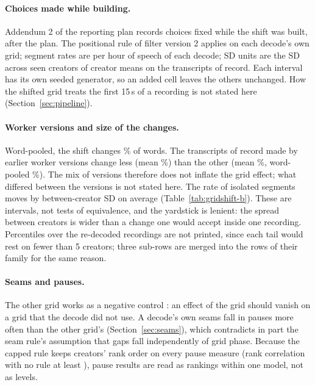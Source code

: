 \paragraph{Choices made while building.} Addendum 2 of the reporting plan records choices fixed while the shift was
built, after the plan. The positional rule of filter version 2 applies on each decode's own grid; segment rates are per
hour of speech of each decode; SD units are the SD across seen creators of creator means on the transcripts of record. Each interval has its own seeded generator, so an added cell leaves the others unchanged. How the shifted grid
treats the first 15\,s of a recording is not stated here (Section~\ref{sec:pipeline}).

\paragraph{Worker versions and size of the changes.} Word-pooled, the shift changes \GsChangedPooledPct\% of words. The
\GsEarlierVersionRecordings{} transcripts of record made by earlier worker versions change less (mean
\GsEarlierVersionMeanPct\%) than the other \GsSameVersionRecordings{} (mean \GsSameVersionMeanPct\%, word-pooled
\GsSameVersionPct\%). The mix of versions therefore does not inflate the grid effect; what differed between the
versions is not stated here. The rate of isolated segments moves by \GsIsoSd{} between-creator SD on average (Table~\ref{tab:gridshift-b}).
These are intervals, not tests of equivalence, and the yardstick is lenient: the spread between creators is wider than a
change one would accept inside one recording. Percentiles over the re-decoded recordings are not printed, since each
tail would rest on fewer than 5 creators; three sub-rows are merged into the rows of their family for the same reason.

\paragraph{Seams and pauses.} The other grid works as a negative control \citep{lipsitch2010negative}: an effect of the
grid should vanish on a grid that the decode did not use. A decode's own seams fall in pauses more often than the other
grid's (Section~\ref{sec:seams}), which contradicts in part the seam rule's assumption that gaps fall independently of
grid phase. Because the capped rule keeps creators' rank order on every pause measure (rank correlation with no rule at
least \SeamRuleRankCorrMin), pause results are read as rankings within one model, not as levels.

